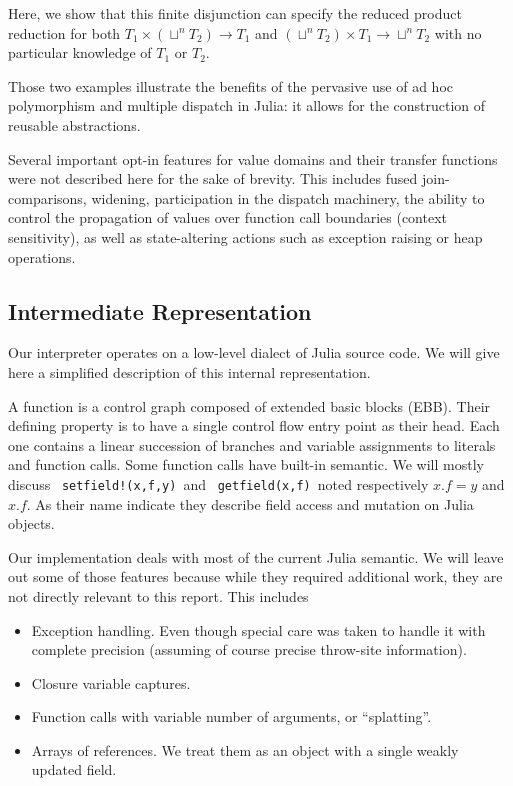 \documentclass[11pt]{article}
\begin{document}
Here, we show that this finite disjunction can specify the reduced product reduction for both $T_1\times\left(\sqcup^nT_2\right)\to T_1$ and $\left(\sqcup^nT_2\right)\times T_1 \to \sqcup^nT_2$ with no particular knowledge of $T_1$ or $T_2$.

Those two examples illustrate the benefits of the pervasive use of ad hoc polymorphism and multiple dispatch in Julia: it allows for the construction of reusable abstractions.

Several important opt-in features for value domains and their transfer functions were not described here for the sake of brevity. This includes fused join-comparisons, widening, participation in the dispatch machinery, the ability to control the propagation of values over function call boundaries (context sensitivity), as well as state-altering actions such as exception raising or heap operations.

\subsection*{Intermediate Representation}

Our interpreter operates on a low-level dialect of Julia source code.
We will give here a simplified description of this internal representation.

A function is a control graph composed of extended basic blocks (EBB). Their defining property is to have a single control flow entry point as their head. Each one contains a linear succession of branches and variable assignments to literals and function calls. Some function calls have built-in semantic. We will mostly discuss \ \verb~setfield!(x,f,y)~\  and \ \verb~getfield(x,f)~\  noted respectively $x.f=y$ and $x.f$.
As their name indicate they describe field access and mutation on Julia objects.

Our implementation deals with most of the current Julia semantic.
We will leave out some of those features because while they required additional work, they are not directly relevant to this report. This includes
\begin{itemize}
\item Exception handling. Even though special care was taken to handle it with complete precision (assuming of course precise throw-site information).
\item Closure variable captures.
\item Function calls with variable number of arguments, or ``splatting''.
\item Arrays of references. We treat them as an object with a single weakly updated field.
\end{itemize}
\end{document}

